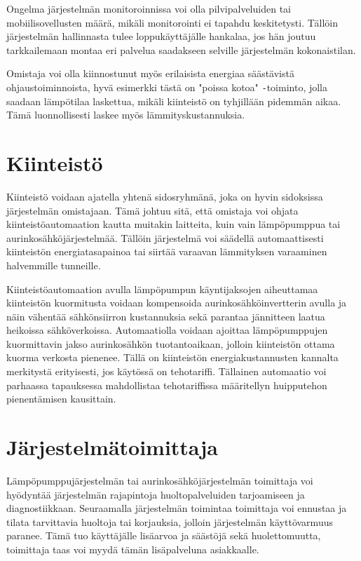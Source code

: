   Ongelma järjestelmän monitoroinnissa voi olla pilvipalveluiden tai mobiilisovellusten määrä, mikäli monitorointi ei tapahdu keskitetysti. Tällöin järjestelmän hallinnasta tulee loppukäyttäjälle hankalaa, jos hän joutuu tarkkailemaan montaa eri palvelua saadakseen selville järjestelmän kokonaistilan.

  Omistaja voi olla kiinnostunut myös erilaisista energiaa säästävistä ohjaustoiminnoista, hyvä esimerkki tästä on "poissa kotoa"{} \texttt{-}toiminto, jolla saadaan lämpötilaa laskettua, mikäli kiinteistö on tyhjillään pidemmän aikaa. Tämä luonnollisesti laskee myös lämmityskustannuksia.

\section{Kiinteistö}
  Kiinteistö voidaan ajatella yhtenä sidosryhmänä, joka on hyvin sidoksissa järjestelmän omistajaan.  Tämä johtuu sitä, että omistaja voi ohjata kiinteistöautomaation kautta muitakin laitteita, kuin vain lämpöpumppua tai aurinkosähköjärjestelmää. Tällöin järjestelmä voi säädellä automaattisesti kiinteistön energiatasapainoa tai siirtää varaavan lämmityksen varaaminen halvemmille tunneille.

  Kiinteistöautomaation avulla lämpöpumpun käyntijaksojen aiheuttamaa kiinteistön kuormitusta voidaan kompensoida aurinkosähköinvertterin avulla ja näin vähentää sähkönsiirron kustannuksia sekä parantaa jännitteen laatua heikoissa sähköverkoissa. Automaatiolla voidaan ajoittaa lämpöpumppujen kuormittavin jakso aurinkosähkön tuotantoaikaan, jolloin kiinteistön ottama kuorma verkosta pienenee. Tällä on kiinteistön energiakustannusten kannalta merkitystä erityisesti, jos käytössä on tehotariffi. Tällainen automaatio voi parhaassa tapauksessa mahdollistaa tehotariffissa määritellyn huipputehon pienentämisen kausittain.


\section{Järjestelmätoimittaja}

  Lämpöpumppujärjestelmän tai aurinkosähköjärjestelmän toimittaja voi hyödyntää järjestelmän rajapintoja huoltopalveluiden tarjoamiseen ja diagnostiikkaan. Seuraamalla järjestelmän toimintaa toimittaja voi ennustaa ja tilata tarvittavia huoltoja tai korjauksia, jolloin järjestelmän käyttövarmuus paranee. Tämä tuo käyttäjälle lisäarvoa ja säästöjä sekä huolettomuutta, toimittaja taas voi myydä tämän lisäpalveluna asiakkaalle. 
  
